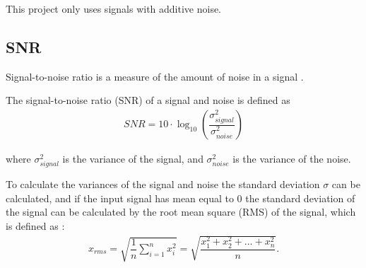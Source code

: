 This project only uses signals with additive noise.

\subsection{SNR}
Signal-to-noise ratio is a measure of the amount of noise in a signal \cite{page 229, DTSP}.
\begin{definition}
The signal-to-noise ratio (SNR) of a signal and noise is defined as
\begin{align} \label{def:SNR}
	SNR=10 \cdot \log_{10}\left(\dfrac{\sigma_{signal}^2}{\sigma_{noise}^2}\right)
\end{align}

where $\sigma_{signal}^2$ is the variance of the signal, and $\sigma_{noise}^2$ is the variance of the noise.
\end{definition}

To calculate the variances of the signal and noise the standard deviation $\sigma$ can be calculated, and if the input signal has mean equal to 0 the standard deviation of the signal can be calculated by the root mean square (RMS) of the signal, which is defined as \cite{page 228, DTSP}:
\begin{align} \label{eq:RMS}
	x_{rms} 
	=\sqrt{\dfrac{1}{n} \sum_{i=1}^n x_i^2}
	= \sqrt{\dfrac{x_1^2 + x_2^2 + \dots + x_n^2}{n}}.
\end{align}